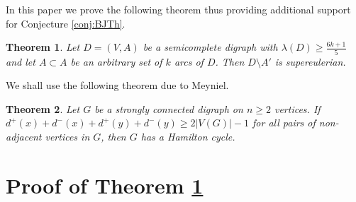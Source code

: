 \documentclass{article}
\newcommand{\2}{\vspace{2mm}}
\theoremstyle{plain}
\newtheorem{theorem}{Theorem}
\theoremstyle{definition}
\begin{document}
  
In this paper we prove the following theorem thus providing additional support for Conjecture \ref{conj:BJTh}.
  \begin{theorem}
    \label{thm:f(k)}
    Let $D=(V,A)$ be a semicomplete digraph with $\lambda{}(D)\geq \frac{6k+1}{5}$ and let $A\subset A$ be an arbitrary set of $k$ arcs of $D$. Then $D\setminus A'$ is supereulerian.
    \end{theorem}
    
We shall use the following theorem due to Meyniel.

\begin{theorem}\cite{meynielJCT14}
  \label{meyniel}
Let $G$ be a strongly connected digraph on $n \geq 2$ vertices.
If $d^+(x)+d^-(x)+d^+(y)+d^-(y) \geq 2|V(G)| -1$ for all pairs of non-adjacent vertices in $G$, then $G$ has a Hamilton cycle.
\end{theorem}

\section{Proof of Theorem \ref{thm:f(k)}}



% 
% 

\end{document}
